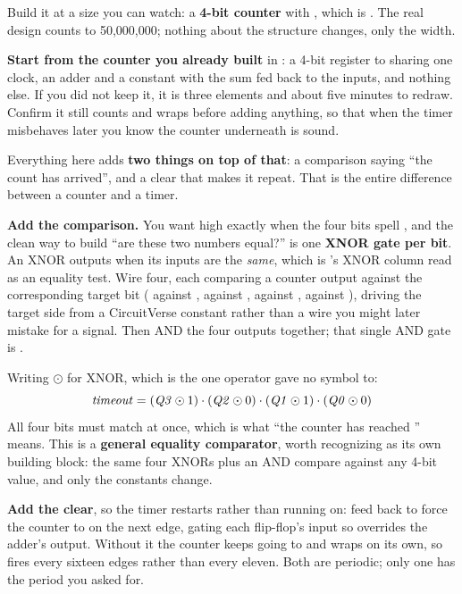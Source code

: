 Build it at a size you can watch: a \textbf{4-bit counter} with , which is
. The real design counts to 50,000,000; nothing about the structure changes, only the
width.

\textbf{Start from the counter you already built} in : a 4-bit register  to
 sharing one clock, an adder and a constant  with the sum fed back to the 
inputs, and nothing else. If you did not keep it, it is three elements and about five minutes to
redraw. Confirm it still counts and wraps before adding anything, so that when the timer misbehaves
later you know the counter underneath is sound.

Everything here adds \textbf{two things on top of that}: a comparison saying ``the count has
arrived'', and a clear that makes it repeat. That is the entire difference between a counter and a
timer.

\textbf{Add the comparison.} You want  high exactly when the four bits spell
, and the clean way to build ``are these two numbers equal?'' is one \textbf{XNOR gate
per bit}. An XNOR outputs  when its inputs are the \emph{same}, which is 's
XNOR column read as an equality test. Wire four, each comparing a counter output against the
corresponding target bit ( against ,  against ,  against
,  against ), driving the target side from a CircuitVerse constant rather
than a wire you might later mistake for a signal. Then AND the four outputs together; that single
AND gate is .

Writing $\odot$ for XNOR, which is the one operator  gave no symbol to:
\[
  \mathit{timeout} = (\mathit{Q3} \odot 1) \cdot (\mathit{Q2} \odot 0) \cdot (\mathit{Q1} \odot 1)
    \cdot (\mathit{Q0} \odot 0)
\]
All four bits must match at once, which is what ``the counter has reached '' means. This
is a \textbf{general equality comparator}, worth recognizing as its own building block: the same
four XNORs plus an AND compare against any 4-bit value, and only the constants change.

\textbf{Add the clear}, so the timer restarts rather than running on: feed  back to
force the counter to  on the next edge, gating each flip-flop's  input so
 overrides the adder's output. Without it the counter keeps going to 
and wraps on its own, so  fires every sixteen edges rather than every eleven. Both
are periodic; only one has the period you asked for.

